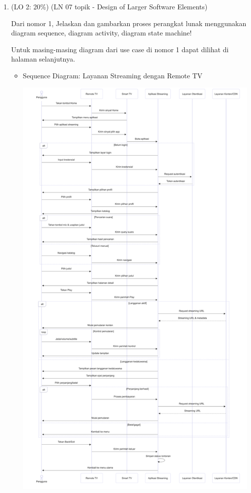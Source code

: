 \documentclass[a4paper]{article}
\begin{document}
\begin{enumerate}[itemsep=1em]
  \item (LO 2: 20\%) (LN 07 topik - Design of Larger Software Elements)

  Dari nomor 1, Jelaskan dan gambarkan proses perangkat lunak menggunakan diagram sequence, diagram activity, diagram state machine!

  \vspace{1em}

  Untuk masing-masing diagram dari use case di nomor 1 dapat dilihat di halaman selanjutnya.

  \pagebreak

  \begin{itemize}[itemsep=1em]
    \item Sequence Diagram: Layanan Streaming dengan Remote TV
    \begin{center}
      \includegraphics[height=0.9\textheight,keepaspectratio]{streaming-sequence-diagram.png}
    \end{center}
  \end{itemize}
  

\end{enumerate}
\end{document}
